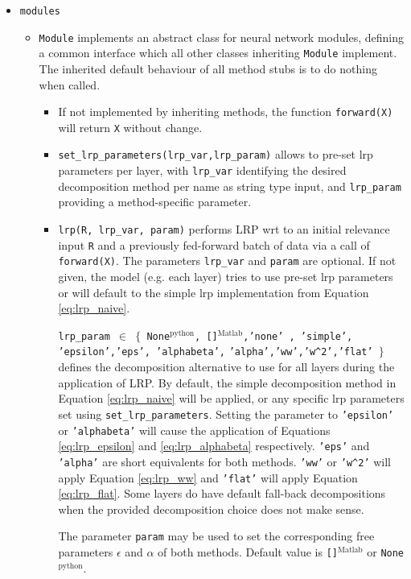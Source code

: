 \documentclass[a4wide]{article}
\newcommand{\mat}{$^\text{Matlab}$}
\newcommand{\py}{$^\text{python}$}
\begin{document}
\begin{itemize}
\begin{itemize}
	\end{itemize}
\item \texttt{modules}
	\begin{itemize}

		\item \texttt{Module} implements an abstract class for neural network modules, defining a common interface which all other classes inheriting \texttt{Module} implement. The inherited default behaviour of all method stubs is to do nothing when called.
	\begin{itemize}
	\item If not implemented by inheriting methods, the function \texttt{forward(X)} will return \texttt{X} without change.
	\item \texttt{set\_lrp\_parameters(lrp\_var,lrp\_param)} allows to pre-set lrp parameters per layer, with \texttt{lrp\_var} identifying the desired decomposition method per name as string type input, and \texttt{lrp\_param} providing a method-specific parameter.
	\item \texttt{lrp(R, lrp\_var, param)} performs LRP wrt to an initial relevance input \texttt{R} and a previously fed-forward batch of data via a call of \texttt{forward(X)}. The parameters \texttt{lrp\_var} and \texttt{param} are optional. If not given,  the model (e.g. each layer) tries to use pre-set lrp parameters or will default to the simple lrp implementation from Equation \ref{eq:lrp_naive}.

				\texttt{lrp\_param $\in$ $\lbrace$ None\py, []\mat,'none' , 'simple', 'epsilon','eps', 'alphabeta',} \texttt{'alpha','ww','w\^{}2','flat' $\rbrace$} defines the decomposition alternative to use for all layers during the application of LRP. By default, the simple decomposition method in Equation \ref{eq:lrp_naive} will be applied, or any specific lrp parameters set using \texttt{set\_lrp\_parameters}. Setting the parameter to \texttt{'epsilon'} or \texttt{'alphabeta'} will cause the application of Equations \ref{eq:lrp_epsilon} and \ref{eq:lrp_alphabeta} respectively. \texttt{'eps'} and \texttt{'alpha'} are short equivalents for both methods. \texttt{'ww'} or \texttt{'w\^{}2'} will apply Equation \ref{eq:lrp_ww} and \texttt{'flat'} will apply Equation \ref{eq:lrp_flat}. Some layers do have default fall-back decompositions when the provided decomposition choice does not make sense.

				The parameter \texttt{param} may be used to set the corresponding free parameters $\epsilon$ and $\alpha$ of both methods. Default value is \texttt{[]\mat} or \texttt{None\py}.
	\end{itemize}


\end{itemize}
\end{itemize}
\end{document}
